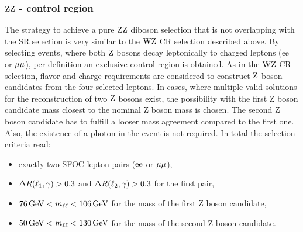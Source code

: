\subsubsection*{$\mathrm{Z}\mathrm{Z}$ - control region}\label{sec:VR}
The strategy to achieve a pure $\mathrm{Z}\mathrm{Z}$ diboson selection that is not overlapping with the SR selection is very similar to the $\mathrm{W}\mathrm{Z}$ CR selection described above. By selecting events, where both $\mathrm{Z}$ bosons decay leptonically to charged leptons ($\mathrm{e}\mathrm{e}$ or $\mu\mu$), per definition an exclusive control region is obtained. As in the $\mathrm{W}\mathrm{Z}$ CR selection, flavor and charge requirements are considered to construct $\mathrm{Z}$ boson candidates from the four selected leptons. In cases, where multiple valid solutions for the reconstruction of two $\mathrm{Z}$ bosons exist, the possibility with the first Z boson candidate mass closest to the nominal Z boson mass is chosen. The second Z boson candidate has to fulfill a looser mass agreement compared to the first one. Also, the existence of a photon in the event is not required. In total the selection criteria read:
\begin{itemize}
 \item exactly two SFOC lepton pairs ($\mathrm{e}\mathrm{e}$ or $\mu\mu$),
 \item $\Delta R(\ell_1,\gamma)>0.3$ and $\Delta R(\ell_2,\gamma)>0.3$ for the first pair,
 \item $76\,\text{Ge\hspace{-.08em}V}<m_{\ell\ell}<106\,\text{Ge\hspace{-.08em}V}$ for the mass of the first Z boson candidate,
 \item $50\,\text{Ge\hspace{-.08em}V}<m_{\ell\ell}<130\,\text{Ge\hspace{-.08em}V}$ for the mass of the second Z boson candidate.
\end{itemize}
